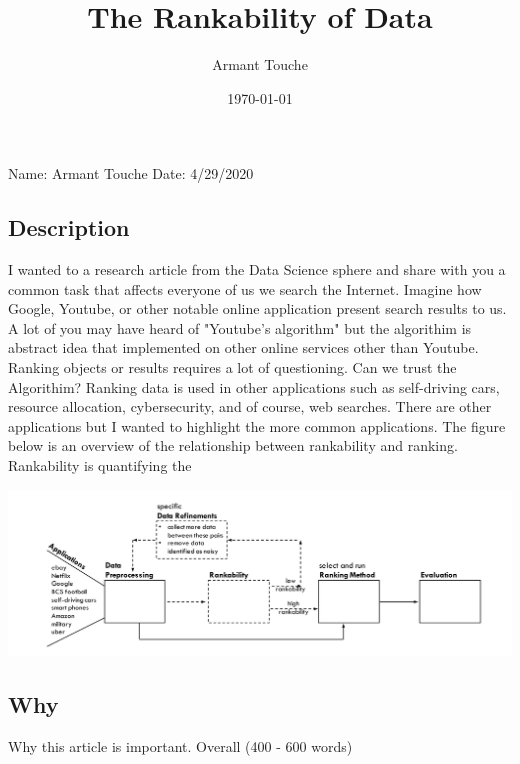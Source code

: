 \documentclass[a4paper,man,biblatex]{apa6}
\title{The Rankability of Data}
\author{Armant Touche}
\affiliation{Portland State University}
\date{\today}
\begin{document}
\thispagestyle{otherpage}
\setcounter{biburllcpenalty}{7000}
\setcounter{biburlucpenalty}{8000}


\noindent Name: Armant Touche\newline
\noindent Date: 4/29/2020

\subsection{Description} I wanted to a research article from the Data Science sphere and share with you a common task that affects everyone of us we search the Internet. Imagine how Google, Youtube, or other notable online application present search results to us. A lot of you may have heard of "Youtube's algorithm" but the algorithim is abstract idea that implemented on other online services other than Youtube. Ranking objects or results requires a lot of questioning. Can we trust the Algorithim? Ranking data is used in other applications such as self-driving cars, resource allocation, cybersecurity, and of course, web searches. There are other applications but I wanted to highlight the more common applications. The figure below is an overview of the relationship between rankability and ranking. Rankability is quantifying the

\includegraphics[width=.75\linewidth]{data_pipe}

\subsection{Why} Why this article is important. Overall (400 - 600 words)

\printbibliography
\end{document}
